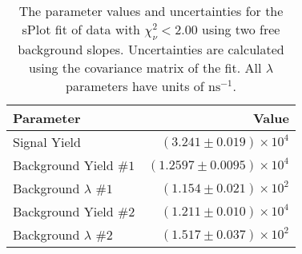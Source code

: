 
\begin{table}[ht]
    \begin{center}
        \begin{tabular}{lr}\toprule
            Parameter & Value \\\midrule
            Signal Yield & $(3.241 \pm 0.019) \times 10^{4}$ \\
            Background Yield $\#1$ & $(1.2597 \pm 0.0095) \times 10^{4}$ \\
            Background $\lambda$ $\#1$ & $(1.154 \pm 0.021) \times 10^{2}$ \\
            Background Yield $\#2$ & $(1.211 \pm 0.010) \times 10^{4}$ \\
            Background $\lambda$ $\#2$ & $(1.517 \pm 0.037) \times 10^{2}$ \\\bottomrule
        \end{tabular}
        \caption{The parameter values and uncertainties for the sPlot fit of data with $\chi^2_\nu < 2.00$ using two free background slopes. Uncertainties are calculated using the covariance matrix of the fit. All $\lambda$ parameters have units of $\si{\nano\second}^{-1}$.}\label{tab:splot-fit-results-chisqdof-2.00-free-2}
    \end{center}
\end{table}
